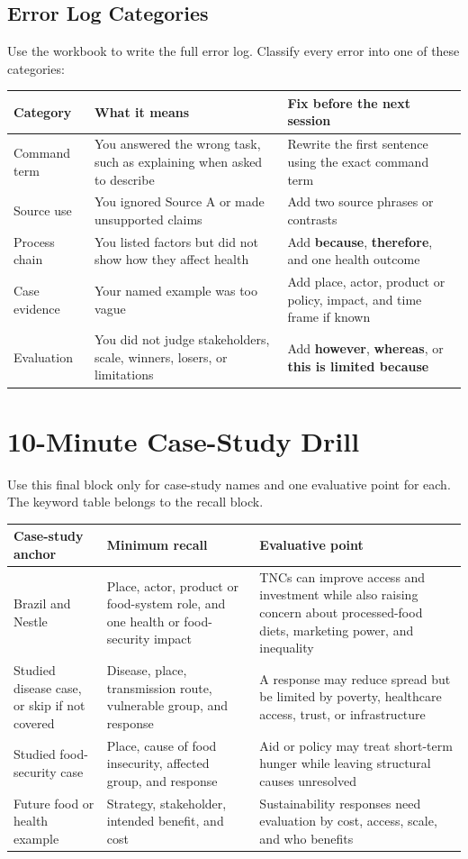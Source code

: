\documentclass[11pt,a4paper]{article}
\newcommand{\term}[1]{\textcolor{HeadingBlue}{\textbf{#1}}}
\begin{document}
\subsection{Error Log Categories}

Use the workbook to write the full error log. Classify every error into one of
these categories:

\begin{tabularx}{\textwidth}{L{0.22\textwidth}Y Y}
\toprule
\textbf{Category} & \textbf{What it means} & \textbf{Fix before the next session} \\
\midrule
Command term & You answered the wrong task, such as explaining when asked to
describe & Rewrite the first sentence using the exact command term \\
Source use & You ignored Source A or made unsupported claims & Add two source
phrases or contrasts \\
Process chain & You listed factors but did not show how they affect health &
Add \term{because}, \term{therefore}, and one health outcome \\
Case evidence & Your named example was too vague & Add place, actor, product or
policy, impact, and time frame if known \\
Evaluation & You did not judge stakeholders, scale, winners, losers, or
limitations & Add \term{however}, \term{whereas}, or \term{this is limited
because} \\
\bottomrule
\end{tabularx}

\section{10-Minute Case-Study Drill}

Use this final block only for case-study names and one evaluative point for
each. The keyword table belongs to the recall block.

\begin{tabularx}{\textwidth}{L{0.23\textwidth}Y Y}
\toprule
\textbf{Case-study anchor} & \textbf{Minimum recall} & \textbf{Evaluative point} \\
\midrule
Brazil and Nestle & Place, actor, product or food-system role, and one health
or food-security impact & TNCs can improve access and investment while also
raising concern about processed-food diets, marketing power, and inequality \\
Studied disease case, or skip if not covered & Disease, place, transmission
route, vulnerable group, and response & A response may reduce spread but be
limited by poverty, healthcare access, trust, or infrastructure \\
Studied food-security case & Place, cause of food insecurity, affected group,
and response & Aid or policy may treat short-term hunger while leaving
structural causes unresolved \\
Future food or health example & Strategy, stakeholder, intended benefit, and
cost & Sustainability responses need evaluation by cost, access, scale, and
who benefits \\
\bottomrule
\end{tabularx}
\end{document}
